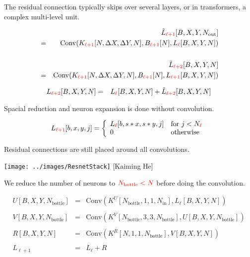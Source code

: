 {The residual connection typically skips over several layers, or in transformers, a complex multi-level unit.

\vfill
{\Large
\begin{eqnarray*}
& & \tilde{L}_{\color{red} \ell+1}[B,X,Y,N_{\mathrm{out}}] \\
& = & \mathrm{Conv}(K_{\color{red} \ell+1}[N,\Delta X,\Delta Y,N],B_{\color{red} \ell+1}[N],L_{\color{red} \ell}[B,X,Y,N]) \\
\\
& & \tilde{L}_{\color{red} \ell+2}[B,X,Y,N] \\
& = & \mathrm{Conv}(K_{\color{red} \ell+1}[N,\Delta X,\Delta Y,N],B_{\color{red} \ell+1}[N],L_{\color{red} \ell+1}[B,X,Y,N])
\end{eqnarray*}
}

\begin{eqnarray*}
L_{\color{red} \ell+2}[B,X,Y,N] & = & L_{\color{red}\ell}[B,X,Y,N] + \tilde{L}_{\color{red} \ell+2}[B,X,Y,N]
\end{eqnarray*}



Spacial reduction and neuron expansion is done without convolution.

\vfill

$$L_{\color{red} \ell+1}[b,x,y,j]  =  \left\{\begin{array}{ll} L_{\color{red} \ell}[b,s*x,s*y,j] & \mbox{for $j < N_{\color{red} \ell}$} \\ 0 & \mbox{otherwise} \end{array}\right.$$

\vfill
Residual connections are still placed around all convolutions.


\centerline{\texttt{[image: ../images/ResnetStack]} {\large [Kaiming He]}}


\newcommand{\Nout}{N_{\mathrm{out}}}
\newcommand{\Nin}{N_{\mathrm{in}}}

We reduce the number of neurons to ${\color{red} N_{\mathrm{bottle}} < N}$ before doing the convolution.

{\huge
\begin{eqnarray*}
U[B,X,Y,N_{\mathrm{bottle}}] & = & \mathrm{Conv}(K^U[N_{\mathrm{bottle}},1,1,\Nin],L_\ell[B,X,Y,N]) \\
\\
V[B,X,Y,N_{\mathrm{bottle}}] & = & \mathrm{Conv}(K^V[N_{\mathrm{bottle}},3,3,N_\mathrm{bottle}],U[B,X,Y,N_{\mathrm{bottle}}]) \\
\\
R[B,X,Y,N] & = & \mathrm{Conv}(K^R[N,1,1,N_{\mathrm{bottle}}],V[B,X,Y,N]) \\
\\
L_{ \ell+1} & = & L_\ell + R
\end{eqnarray*}
}

}
